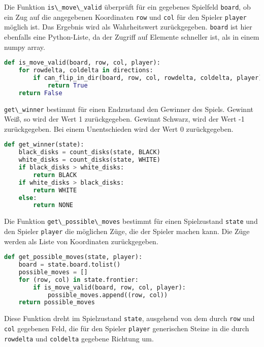 Die Funktion \passthrough{\lstinline!is\_move\_valid!} überprüft für ein
gegebenes Spielfeld \passthrough{\lstinline!board!}, ob ein Zug auf die
angegebenen Koordinaten \passthrough{\lstinline!row!} und
\passthrough{\lstinline!col!} für den Spieler
\passthrough{\lstinline!player!} möglich ist. Das Ergebnis wird als
Wahrheitswert zurückgegeben. \passthrough{\lstinline!board!} ist hier
ebenfalls eine Python-Liste, da der Zugriff auf Elemente schneller ist,
als in einem numpy array.

\begin{lstlisting}[language=Python]
def is_move_valid(board, row, col, player):
    for rowdelta, coldelta in directions:
        if can_flip_in_dir(board, row, col, rowdelta, coldelta, player):
            return True
    return False
\end{lstlisting}

\passthrough{\lstinline!get\_winner!} bestimmt für einen Endzustand den
Gewinner des Spiels. Gewinnt Weiß, so wird der Wert 1 zurückgegeben.
Gewinnt Schwarz, wird der Wert -1 zurückgegeben. Bei einem Unentschieden
wird der Wert 0 zurückgegeben.

\begin{lstlisting}[language=Python]
def get_winner(state):
    black_disks = count_disks(state, BLACK)
    white_disks = count_disks(state, WHITE)
    if black_disks > white_disks:
        return BLACK
    if white_disks > black_disks:
        return WHITE
    else:
        return NONE
\end{lstlisting}

Die Funktion \passthrough{\lstinline!get\_possible\_moves!} bestimmt für
einen Spielzustand \passthrough{\lstinline!state!} und den Spieler
\passthrough{\lstinline!player!} die möglichen Züge, die der Spieler
machen kann. Die Züge werden als Liste von Koordinaten zurückgegeben.

\begin{lstlisting}[language=Python]
def get_possible_moves(state, player):
    board = state.board.tolist()
    possible_moves = []
    for (row, col) in state.frontier:
        if is_move_valid(board, row, col, player):
            possible_moves.append((row, col))
    return possible_moves
\end{lstlisting}

Diese Funktion dreht im Spielzustand \passthrough{\lstinline!state!},
ausgehend von dem durch \passthrough{\lstinline!row!} und
\passthrough{\lstinline!col!} gegebenen Feld, die für den Spieler
\passthrough{\lstinline!player!} generischen Steine in die durch
\passthrough{\lstinline!rowdelta!} und
\passthrough{\lstinline!coldelta!} gegebene Richtung um.

